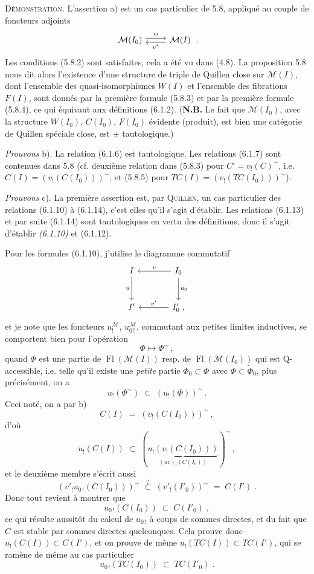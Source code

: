 \documentclass[11pt]{article}
\newcommand{\printedpage}[1]{\marginpar{\footnotesize p.~#1}}
\newcommand{\msp}[1]{\marginpar{\footnotesize [#1]}}
\newcommand{\Fl}{\operatorname{Fl}}
\newcommand{\tl}{^{\sim}}
\begin{document}
\textsc{Démonstration}. L'assertion a) est un cas particulier de 5.8, appliqué au couple de foncteurs adjoints
\[
\begin{tikzcd}
\mathcal{M}(I_0) \arrow[r, shift left, "v_!"] & \mathcal{M}(I) \arrow[l, shift left, "v^{*}"]
\end{tikzcd}
\;.
\]
Les conditions (5.8.2) sont satisfaites, cela a été vu dans (4.8). La proposition 5.8 nous dit alors l'existence d'une structure de triple de Quillen close sur $\mathcal{M}(I)$, dont l'ensemble des quasi-isomorphismes $W(I)$ et l'ensemble des fibrations $F(I)$, sont donnés par la première formule (5.8.3) et par la première formule (5.8.4), ce qui équivaut aux définitions (6.1.2). (\textbf{N.B.} Le fait que $\mathcal{M}(I_0)$, avec la structure $W(I_0)$, $C(I_0)$, $F(I_0)$ évidente (produit), est
\printedpage{51}
\msp{page 102}
bien une catégorie de Quillen spéciale close, est $\pm$ tautologique.)

\textit{Prouvons} b). La relation (6.1.6) est tautologique. Les relations (6.1.7) sont contenues dans 5.8 (cf. deuxième relation dans (5.8.3) pour $C' = v_!(C)\tl$, i.e. $C(I) = (v_!(C(I_0)))\tl$, et (5.8.5) pour $TC(I) = (v_!(TC(I_0)))\tl$).

\textit{Prouvons} c). La première assertion est, par \textsc{Quillen}, un cas particulier des relations (6.1.10) à (6.1.14), c'est elles qu'il s'agit d'établir. Les relations (6.1.13) et par suite (6.1.14) sont tautologiques en vertu des définitions, donc il s'agit d'établir \textit{(6.1.10)} et (6.1.12).

Pour les formules (6.1.10), j'utilise le diagramme commutatif
\[
\begin{tikzcd}[row sep=large, column sep=large]
I \arrow[d, "u"'] & I_0 \arrow[l, "v"'] \arrow[d, "u_0"] \\
I' & I'_0\;, \arrow[l, "v'"']
\end{tikzcd}
\]
et je note que les foncteurs $u_!^{\mathcal{M}}$, $u_{0\,!}^{\mathcal{M}}$, commutant aux petites limites inductives, se
\msp{page 103}
comportent bien pour l'opération
\[
\Phi \longmapsto \Phi\tl\,,
\]
quand $\Phi$ est une partie de $\Fl(\mathcal{M}(I))$ resp. de $\Fl(\mathcal{M}(I_0))$ qui est Q-accessible, i.e. telle qu'il existe une \textit{petite} partie $\Phi_0 \subset \Phi$ avec $\Phi \subset \tilde{\Phi}_0$, plus précisément, on a
\[
u_!(\Phi\tl) \;\subset\; (u_!(\Phi))\tl\,.
\]
Ceci noté, on a par b)
\[
C(I) \;=\; (v_!(C(I_0)))\tl\,,
\]
d'où
\[
u_!(C(I)) \;\subset\; (\underbrace{u_!(v_!(C(I_0)))}_{(uv)_!(C(I_0))})\tl\,,
\]
et le deuxième membre s'écrit aussi
\[
(v'_!u_{0\,!}(C(I_0)))\tl \;\overset{?}{\subset}\; (v'_!(I'_0))\tl \;=\; C(I')\;. %
\]
Donc tout revient à montrer que
\[
u_{0\,!}(C(I_0)) \;\subset\; C(I'_0)\;,
\tag*{(6.1.16)}
\]
ce qui résulte aussitôt du calcul de $u_{0\,!}$ à coups de sommes directes, et du fait que $C$ est stable par sommes directes quelconques. Cela prouve donc $u_!(C(I)) \subset C(I')$, et on prouve de même $u_!(TC(I)) \subset TC(I')$, qui se ramène de même au cas particulier
\[
u_{0\,!}(TC(I_0)) \;\subset\; TC(I'_0)\;.
\tag*{(6.1.17)}
\]
\end{document}
